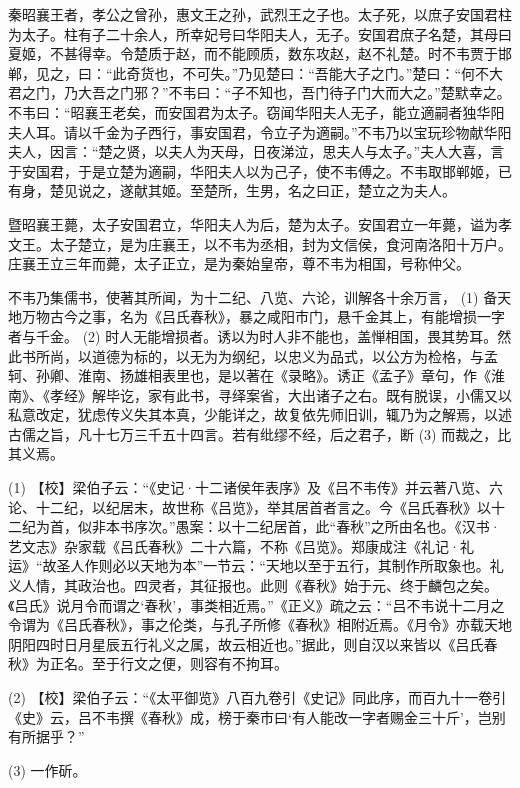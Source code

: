 \documentclass[12pt,UTF8]{ctexbook}
\begin{document}
秦昭襄王者，孝公之曾孙，惠文王之孙，武烈王之子也。太子死，以庶子安国君柱为太子。柱有子二十余人，所幸妃号曰华阳夫人，无子。安国君庶子名楚，其母曰夏姬，不甚得幸。令楚质于赵，而不能顾质，数东攻赵，赵不礼楚。时不韦贾于邯郸，见之，曰：“此奇货也，不可失。”乃见楚曰：“吾能大子之门。”楚曰：“何不大君之门，乃大吾之门邪？”不韦曰：“子不知也，吾门待子门大而大之。”楚默幸之。不韦曰：“昭襄王老矣，而安国君为太子。窃闻华阳夫人无子，能立適嗣者独华阳夫人耳。请以千金为子西行，事安国君，令立子为適嗣。”不韦乃以宝玩珍物献华阳夫人，因言：“楚之贤，以夫人为天母，日夜涕泣，思夫人与太子。”夫人大喜，言于安国君，于是立楚为適嗣，华阳夫人以为己子，使不韦傅之。不韦取邯郸姬，已有身，楚见说之，遂献其姬。至楚所，生男，名之曰正，楚立之为夫人。

暨昭襄王薨，太子安国君立，华阳夫人为后，楚为太子。安国君立一年薨，谥为孝文王。太子楚立，是为庄襄王，以不韦为丞相，封为文信侯，食河南洛阳十万户。庄襄王立三年而薨，太子正立，是为秦始皇帝，尊不韦为相国，号称仲父。

不韦乃集儒书，使著其所闻，为十二纪、八览、六论，训解各十余万言， (1) 备天地万物古今之事，名为《吕氏春秋》，暴之咸阳市门，悬千金其上，有能增损一字者与千金。 (2) 时人无能增损者。诱以为时人非不能也，盖惮相国，畏其势耳。然此书所尚，以道德为标的，以无为为纲纪，以忠义为品式，以公方为检格，与孟轲、孙卿、淮南、扬雄相表里也，是以著在《录略》。诱正《孟子》章句，作《淮南》、《孝经》解毕讫，家有此书，寻绎案省，大出诸子之右。既有脱误，小儒又以私意改定，犹虑传义失其本真，少能详之，故复依先师旧训，辄乃为之解焉，以述古儒之旨，凡十七万三千五十四言。若有纰缪不经，后之君子，断 (3) 而裁之，比其义焉。

(1) 【校】梁伯子云：“《史记·十二诸侯年表序》及《吕不韦传》并云著八览、六论、十二纪，以纪居末，故世称《吕览》，举其居首者言之。今《吕氏春秋》以十二纪为首，似非本书序次。”愚案：以十二纪居首，此“春秋”之所由名也。《汉书·艺文志》杂家载《吕氏春秋》二十六篇，不称《吕览》。郑康成注《礼记·礼运》“故圣人作则必以天地为本”一节云：“天地以至于五行，其制作所取象也。礼义人情，其政治也。四灵者，其征报也。此则《春秋》始于元、终于麟包之矣。《吕氏》说月令而谓之‘春秋’，事类相近焉。”《正义》疏之云：“吕不韦说十二月之令谓为《吕氏春秋》，事之伦类，与孔子所修《春秋》相附近焉。《月令》亦载天地阴阳四时日月星辰五行礼义之属，故云相近也。”据此，则自汉以来皆以《吕氏春秋》为正名。至于行文之便，则容有不拘耳。

(2) 【校】梁伯子云：“《太平御览》八百九卷引《史记》同此序，而百九十一卷引《史》云，吕不韦撰《春秋》成，榜于秦市曰‘有人能改一字者赐金三十斤’，岂别有所据乎？”

(3) 一作斫。
\end{document}

